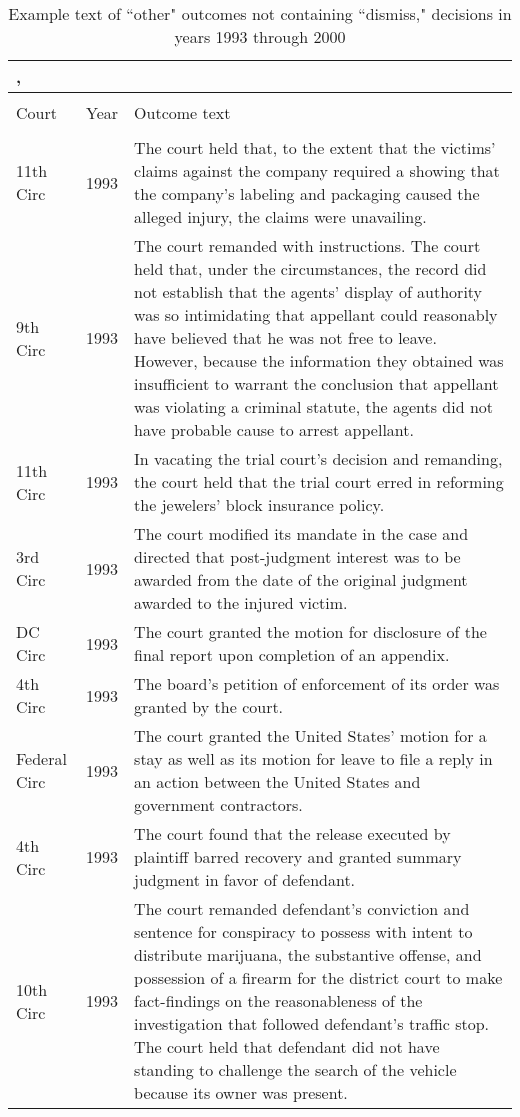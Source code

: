 \documentclass[10pt, letterpaper]{article}
\begin{document}
\begin{spacing}{1.0}
\clearpage

\begin{small}
\begin{longtable}[H]{llp{5in}}
    \caption{Example text of ``other" outcomes not containing ``dismiss," decisions in years 1993 through 2000}, \\
    \hline\\[-6pt]
    Court & Year & Outcome text\\[2pt]
    \hline\\[-6pt]
    \endhead
    11th Circ & 1993 & The court held that, to the extent that the victims' claims against the company required a showing that the company's labeling and packaging caused the alleged injury, the claims were unavailing.\\[4pt]
    9th Circ & 1993 & The court remanded with instructions. The court held that, under the circumstances, the record did not establish that the agents' display of authority was so intimidating that appellant could reasonably have believed that he was not free to leave. However, because the information they obtained was insufficient to warrant the conclusion that appellant was violating a criminal statute, the agents did not have probable cause to arrest appellant.\\[4pt]
    11th Circ & 1993 & In vacating the trial court's decision and remanding, the court held that the trial court erred in reforming the jewelers' block insurance policy.\\[4pt]
    3rd Circ & 1993 & The court modified its mandate in the case and directed that post-judgment interest was to be awarded from the date of the original judgment awarded to the injured victim.\\[4pt]
    DC Circ & 1993 & The court granted the motion for disclosure of the final report upon completion of an appendix.\\[4pt]
    4th Circ & 1993 & The board's petition of enforcement of its order was granted by the court.\\[4pt]
    Federal Circ & 1993 & The court granted the United States' motion for a stay as well as its motion for leave to file a reply in an action between the United States and government contractors.\\[4pt]
    4th Circ & 1993 & The court found that the release executed by plaintiff barred recovery and granted summary judgment in favor of defendant.\\[4pt]
    10th Circ & 1993 & The court remanded defendant's conviction and sentence for conspiracy to possess with intent to distribute marijuana, the substantive offense, and possession of a firearm for the district court to make fact-findings on the reasonableness of the investigation that followed defendant's traffic stop. The court held that defendant did not have standing to challenge the search of the vehicle because its owner was present.\\[4pt]

\end{longtable}
\end{small}
\end{spacing}
\end{document}
